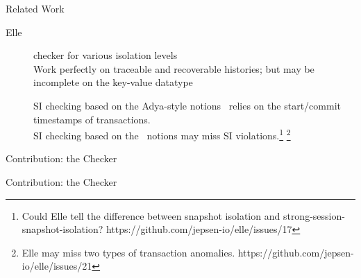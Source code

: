\begin{frame}{Related Work}
  \begin{description}
    \item[Elle~] checker for various isolation levels \\[2pt]

      \vspace{0.20cm}
      Work perfectly on traceable and recoverable histories;
      but may be incomplete on the key-value datatype

      \pause
      \vspace{0.20cm}
      SI checking based on the Adya-style notions~
      relies on the start/commit timestamps of transactions.\\[2pt]

      \pause
      \vspace{0.20cm}
      SI checking based on the~ notions
      may miss SI violations.\footnote{
        Could Elle tell the difference between snapshot isolation and strong-session-snapshot-isolation? https://github.com/jepsen-io/elle/issues/17}
        \footnote{Elle may miss two types of transaction anomalies. https://github.com/jepsen-io/elle/issues/21}
  \end{description}
\end{frame}

\begin{frame}{Contribution: the \polysi{} Checker}
\end{frame}

\begin{frame}{Contribution: the \polysi{} Checker}
  \begin{center}
    

    \vspace{0.50cm}
  \end{center}
\end{frame}

